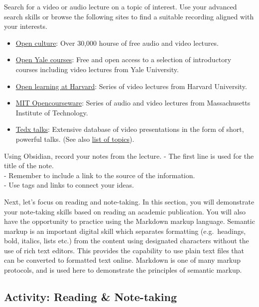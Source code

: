 \documentclass[
]{book}
\providecommand{\tightlist}{%
  \setlength{\itemsep}{0pt}\setlength{\parskip}{0pt}}
\theoremstyle{definition}
\theoremstyle{definition}
\theoremstyle{definition}
\theoremstyle{definition}
\theoremstyle{remark}
\begin{document}
\begin{reflect}
Search for a video or audio lecture on a topic of interest. Use your advanced search skills or browse the following sites to find a suitable recording aligned with your interests.

\begin{itemize}
\tightlist
\item
  \href{https://www.openculture.com/freeonlinecourses}{Open culture}: Over 30,000 hourse of free audio and video lectures.
\item
  \href{https://oyc.yale.edu/}{Open Yale courses}: Free and open access to a selection of introductory courses including video lectures from Yale University.
\item
  \href{https://extension.harvard.edu/online-learning/}{Open learning at Harvard}: Series of video lectures from Harvard University.
\item
  \href{https://ocw.mit.edu/search/?f=Lecture\%20Videos\&f=Lecture\%20Audio\&s=department_course_numbers.sort_coursenum}{MIT Opencourseware}: Series of audio and video lectures from Massachusetts Institute of Technology.
\item
  \href{https://www.ted.com/}{Tedx talks}: Extensive database of video presentations in the form of short, powerful talks. (See also \href{https://www.ted.com/topics}{list of topics}).
\end{itemize}

Using Obsidian, record your notes from the lecture.
- The first line is used for the title of the note.\\
- Remember to include a link to the source of the information.\\
- Use tags and links to connect your ideas.
\end{reflect}

Next, let's focus on reading and note-taking. In this section, you will demonstrate your note-taking skills based on reading an academic publication. You will also have the opportunity to practice using the Markdown markup language. Semantic markup is an important digital skill which separates formatting (e.g.~headings, bold, italics, lists etc.) from the content using designated characters without the use of rich text editors. This provides the capability to use plain text files that can be converted to formatted text online. Markdown is one of many markup protocols, and is used here to demonstrate the principles of semantic markup.

\hypertarget{activity-reading-note-taking}{%
\subsection*{Activity: Reading \& Note-taking}\label{activity-reading-note-taking}}
\end{document}
